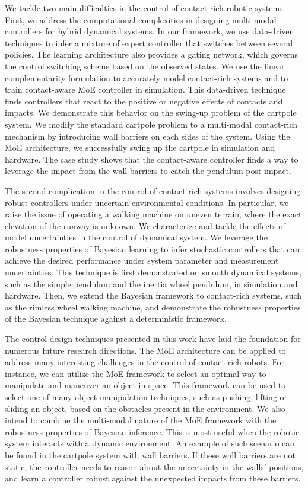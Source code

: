 We tackle two main difficulties in the control of contact-rich robotic systems.
%
First, we address the computational complexities in designing multi-modal
controllers for hybrid dynamical systems.
%
In our framework, we use data-driven techniques to infer a mixture of expert
controller that switches between several policies.
%
The learning architecture also provides a gating network, which governs the
control switching scheme based on the observed states.
%
We use the linear complementarity formulation to accurately model contact-rich
systems and to train contact-aware MoE controller in simulation.
%
This data-driven technique finds controllers that react to the positive or
negative effects of contacts and impacts.
%
We demonstrate this behavior on the swing-up problem of the cartpole system.
%
We modify the standard cartpole problem to a multi-modal contact-rich mechanism
by introducing wall barriers on each sides of the system.
%
Using the MoE architecture, we successfully swing up the cartpole in simulation
and hardware.
%
The case study shows that the contact-aware controller finds a way to leverage
the impact from the wall barriers to catch the pendulum post-impact.
%

The second complication in the control of contact-rich systems involves
designing robust controllers under uncertain environmental conditions.
%
In particular, we raise the issue of operating a walking machine on uneven
terrain, where the exact elevation of the runway is unknown.
%
We characterize and tackle the effects of model uncertainties in the control of
dynamical system.
%
We leverage the robustness properties of Bayesian learning to infer stochastic
controllers that can achieve the desired performance under system parameter and
measurement uncertainties.
%
This technique is first demonstrated on smooth dynamical systems, such as the
simple pendulum and the inertia wheel pendulum, in simulation and hardware.
%
Then, we extend the Bayesian framework to contact-rich systems, such as the
rimless wheel walking machine, and demonstrate the robustness properties of the
Bayesian technique against a deterministic framework.

The control design techniques presented in this work have laid the foundation
for numerous future research directions.
%
The MoE architecture can be applied to address many interesting challenges in
the control of contact-rich robots.
%
For instance, we can utilize the MoE framework to select an optimal way to
manipulate and maneuver an object in space.
%
This framework can be used to select one of many object manipulation techniques,
such as pushing, lifting or sliding an object, based on the obstacles present in
the environment.
%
We also intend to combine the multi-modal nature of the MoE framework with the
robustness properties of Bayesian inference. 
%
This is most useful when the robotic system interacts with a dynamic
environment.
%
An example of such scenario can be found in the cartpole system with wall
barriers.
%
If these wall barriers are not static, the controller needs to reason about the
uncertainty in the walls' positions, and learn a controller robust against the
unexpected impacts from these barriers.
